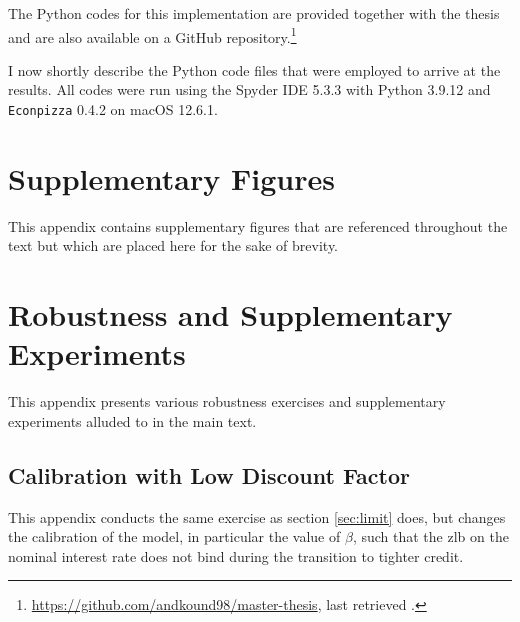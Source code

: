 \documentclass[12pt]{article} %
\numberwithin{equation}{section} %
\begin{document}
\begin{refsection}
\begin{appendices}
The Python codes for this implementation are provided together with the thesis and are also available on a GitHub repository.\footnote{\url{https://github.com/andkound98/master-thesis}, last retrieved .}

I now shortly describe the Python code files that were employed to arrive at the results. All codes were run using the Spyder IDE 5.3.3 with Python 3.9.12 and \texttt{Econpizza} 0.4.2 on macOS 12.6.1.

\thispagestyle{plain}
\section{Supplementary Figures}
\label{sec-app:figures}

This appendix contains supplementary figures that are referenced throughout the text but which are placed here for the sake of brevity.

\thispagestyle{plain}
\section{Robustness and Supplementary Experiments}
\label{sec-app:robust}

This appendix presents various robustness exercises and supplementary experiments alluded to in the main text.

\subsection{Calibration with Low Discount Factor}
\label{sec-app:robust-beta-calibration}

This appendix conducts the same exercise as section \ref{sec:limit} does, but changes the calibration of the model, in particular the value of $\beta$, such that the \Gls{zlb} on the nominal interest rate does not bind during the transition to tighter credit.


\end{appendices}
\end{refsection}
\end{document}
